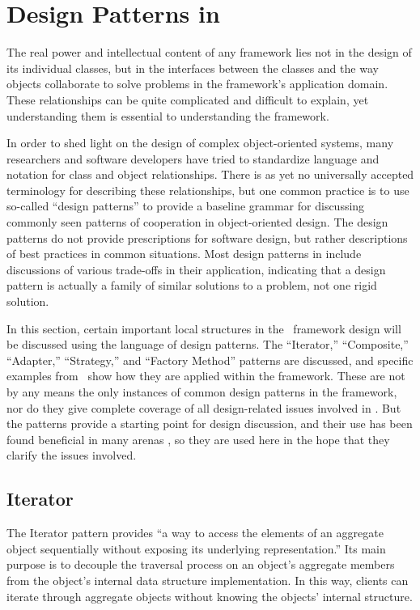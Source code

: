 \section{Design Patterns in \aicat}

The real power and intellectual content of any framework lies not in
the design of its individual classes, but in the interfaces between
the classes and the way objects collaborate to solve problems in the
framework's application domain. \cite[p. 31]{fayad:99} These
relationships can be quite complicated and difficult to explain, yet
understanding them is essential to understanding the framework.

In order to shed light on the design of complex object-oriented
systems, many researchers and software developers have tried to
standardize language and notation for class and object relationships.
There is as yet no universally accepted terminology for describing
these relationships, but one common practice is to use so-called
``design patterns'' to provide a baseline grammar for discussing
commonly seen patterns of cooperation in object-oriented
design. \cite[p. 3]{gamma:95} The design patterns do not provide
prescriptions for software design, but rather descriptions of best
practices in common situations.  Most design patterns in
\cite{gamma:95} include discussions of various trade-offs in their
application, indicating that a design pattern is actually a family of
similar solutions to a problem, not one rigid solution.

In this section, certain important local structures in the \aicat\
framework design will be discussed using the language of design
patterns.  The ``Iterator,'' ``Composite,'' ``Adapter,'' ``Strategy,''
and ``Factory Method'' patterns are discussed, and specific examples
from \aicat\ show how they are applied within the framework.  These
are not by any means the only instances of common design patterns in
the framework, nor do they give complete coverage of all
design-related issues involved in \aicat.  But the patterns provide a
starting point for design discussion, and their use has been found
beneficial in many arenas \cite{granlund:99}, so they are used here in
the hope that they clarify the issues involved.

\subsection{Iterator}

The Iterator pattern provides ``a way to access the elements of an
aggregate object sequentially without exposing its underlying
representation.'' \cite[p. 257]{gamma:95} Its main purpose is to
decouple the traversal process on an object's aggregate members from
the object's internal data structure implementation.  In this way,
clients can iterate through aggregate objects without knowing the
objects' internal structure.

